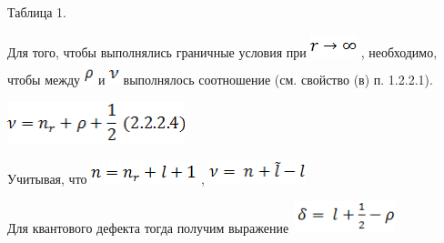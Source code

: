 \documentclass{article}
\begin{document}
\vspace{10pt}
\begin{center}
Таблица 1.
\end{center}

\vspace{10pt}
\baselineskip=18pt
\leftskip=0pt
{\large{}Для того, чтобы выполнялись граничные 
условия при }
\includegraphics[width=38pt, height=19pt, keepaspectratio=true]{3-fig019.png}
{\large{}, необходимо, чтобы между }
\includegraphics[width=8pt, height=19pt, keepaspectratio=true]{3-fig020.png}
{\large{} и }
\includegraphics[width=8pt, height=19pt, keepaspectratio=true]{3-fig021.png}
{\large{} выполнялось соотношение (см. свойство 
(в) п. 1.2.2.1).}

\vspace{10pt}
\includegraphics[width=146pt, height=34pt, keepaspectratio=true]{3-fig022.png}

\vspace{28pt}
{\large{}Учитывая, что }
\includegraphics[width=87pt, height=19pt, keepaspectratio=true]{3-fig023.png}
{\large{}, }
\includegraphics[width=80pt, height=20pt, keepaspectratio=true]{3-fig024.png}

\vspace{10pt}
{\large{}Для квантового дефекта тогда получим выражение}
\includegraphics[width=85pt, height=26pt, keepaspectratio=true]{3-fig025.png}
\end{document}
